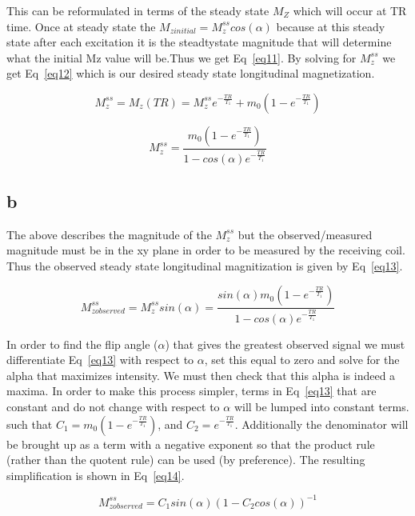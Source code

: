 \documentclass[12pt]{article}
\begin{document}
This can be reformulated in terms of the steady state $M_Z$ which will occur at TR time. Once at steady state the $M_{zinitial} = M_z^{ss}cos(\alpha)$ because at this steady state after each excitation it is the steadtystate magnitude that will determine what the initial Mz value will be.Thus we get Eq~\ref{eq11}. By solving for $M_z^{ss}$ we get Eq~\ref{eq12} which is our desired steady state longitudinal magnetization.

\begin{equation}
M_z^{ss} = M_z(TR) = M_z^{ss}  e^{-\frac{TR}{T_1}} + m_0(1-e^{-\frac{TR}{T_1}})
\label{eq11}
\end{equation}

\begin{equation}
M_z^{ss} =\frac{m_0(1-e^{-\frac{TR}{T_1}})}{1- cos(\alpha)e^{-\frac{TR}{T_1}}}
\label{eq12}
\end{equation}

\subsection{b}
The above describes the magnitude of the $M_z^{ss}$ but the observed/measured magnitude must be in the xy plane in order to be measured by the receiving coil. Thus the observed steady state longitudinal magnitization is given by Eq~\ref{eq13}.

\begin{equation}
M_{zobserved}^{ss} =M_{z}^{ss}sin(\alpha) = \frac{sin(\alpha)m_0(1-e^{-\frac{TR}{T_1}})}{1- cos(\alpha)e^{-\frac{TR}{T_1}}}
\label{eq13}
\end{equation}

In order to find the flip angle ($\alpha$) that gives the greatest observed signal we must differentiate Eq~\ref{eq13} with respect to $\alpha$, set this equal to zero and solve for the alpha that maximizes intensity. We must then check that this alpha is indeed a maxima. In order to make this process simpler, terms in Eq~\ref{eq13} that are constant and do not change with respect to $\alpha$ will be lumped into constant terms. such that $C_1 = m_0(1-e^{-\frac{TR}{T_1}})$, and $C_2 = e^{-\frac{TR}{T_1}}$. Additionally the denominator will be brought up as a term with a negative exponent so that the product rule (rather than the quotent rule) can be used (by preference). The resulting simplification is shown in Eq~\ref{eq14}.

\begin{equation}
M_{zobserved}^{ss} = C_1sin(\alpha)(1- C_2cos(\alpha))^{-1}
\label{eq14}
\end{equation}
\end{document}
